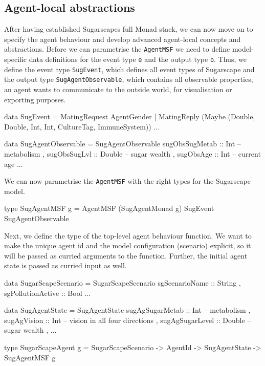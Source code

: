 \subsection{Agent-local abstractions}
After having established Sugarscapes full Monad stack, we can now move on to specify the agent behaviour and develop advanced agent-local concepts and abstractions. Before we can parametrise the \texttt{AgentMSF} we need to define model-specific data definitions for the event type \texttt{e} and the output type \texttt{o}. Thus, we define the event type \texttt{SugEvent}, which defines all event types of Sugarscape and the output type \texttt{SugAgentObservable}, which contains all observable properties, an agent wants to communicate to the outside world, for visualisation or exporting purposes. 

\begin{HaskellCode}
data SugEvent = MatingRequest AgentGender
              | MatingReply 
                 (Maybe (Double, Double, Int, Int, CultureTag, ImmuneSystem))
              ...

data SugAgentObservable = SugAgentObservable
  { sugObsSugMetab :: Int     -- metabolism
  , sugObsSugLvl   :: Double  -- sugar wealth
  , sugObsAge      :: Int     -- current age
  ...  
  }
\end{HaskellCode}

We can now parametrise the \texttt{AgentMSF} with the right types for the Sugarscape model.

\begin{HaskellCode}
type SugAgentMSF g = AgentMSF (SugAgentMonad g) SugEvent SugAgentObservable
\end{HaskellCode}

Next, we define the type of the top-level agent behaviour function. We want to make the unique agent id and the model configuration (scenario) explicit, so it will be passed as curried arguments to the function. Further, the initial agent state is passed as curried input as well.

\begin{HaskellCode}
data SugarScapeScenario = SugarScapeScenario 
  { sgScenarioName    :: String
  , sgPollutionActive :: Bool
  ...
  }

data SugAgentState = SugAgentState
  { sugAgSugarMetab :: Int     -- metabolism
  , sugAgVision     :: Int     -- vision in all four directions
  , sugAgSugarLevel :: Double  -- sugar wealth
  , ...
  }
  
type SugarScapeAgent g 
       = SugarScapeScenario -> AgentId -> SugAgentState -> SugAgentMSF g
\end{HaskellCode}


